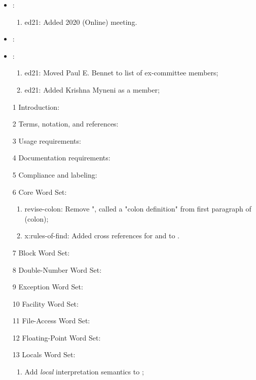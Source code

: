 
	\begin{itemize}
	\item {}:						%
		\begin{enumerate}
			\item \textsf{ed21}: Added 2020 (Online) meeting.
		\end{enumerate}
	\item {}:						%
	\item {}:					%
		\begin{enumerate}
			\item \textsf{ed21}: Moved Paul E. Bennet to list of ex-committee members;
			\item \textsf{ed21}: Added Krishna Myneni as a member;
		\end{enumerate}
	\item[1] Introduction:						%
	\item[2] Terms, notation, and references:	%
	\item[3] Usage requirements:				%
	\item[4] Documentation requirements:	%
	\item[5] Compliance and labeling:		%
	\item[6] Core Word Set:					%
		\begin{enumerate}
		\item \textsf{revise-colon}: Remove ", called a "colon definition" from
			first paragraph of  (colon);
		\item \textsf{x:rules-of-find}: Added cross references for
			 and 
			to .
		\end{enumerate}
	\item[7] Block Word Set:					%
	\item[8] Double-Number Word Set:		%
	\item[9] Exception Word Set:				%
	\item[10] Facility Word Set:				%
	\item[11] File-Access Word Set:			%
	\item[12] Floating-Point Word Set:		%
	\item[13] Locals Word Set:				%
		\begin{enumerate}
		\item Add \emph{local} interpretation semantics to ;

\end{enumerate}
\end{itemize}
